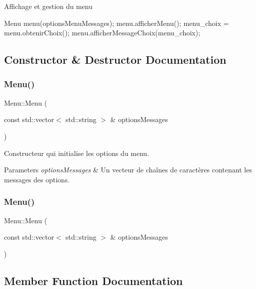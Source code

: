 Affichage et gestion du menu \begin{DoxyVerb}Menu menu(optionsMenuMessages);
menu.afficherMenu();
menu_choix = menu.obtenirChoix();
menu.afficherMessageChoix(menu_choix);\end{DoxyVerb}
 

\subsection{Constructor \& Destructor Documentation}
\mbox{\label{classMenu_a08614e9db9f4da4c6bcd37887d3df51a}} 
\subsubsection{\texorpdfstring{Menu()}{Menu()}\hspace{0.1cm}{\footnotesize\ttfamily [1/2]}}
{\footnotesize\ttfamily Menu\+::\+Menu (\begin{DoxyParamCaption}\item[{const std\+::vector$<$ std\+::string $>$ \&}]{options\+Messages }\end{DoxyParamCaption})}



Constructeur qui initialise les options du menu. 


\begin{DoxyParams}{Parameters}
{\em options\+Messages} & Un vecteur de chaînes de caractères contenant les messages des options. \\
\hline
\end{DoxyParams}
\mbox{\label{classMenu_a08614e9db9f4da4c6bcd37887d3df51a}} 
\subsubsection{\texorpdfstring{Menu()}{Menu()}\hspace{0.1cm}{\footnotesize\ttfamily [2/2]}}
{\footnotesize\ttfamily Menu\+::\+Menu (\begin{DoxyParamCaption}\item[{const std\+::vector$<$ std\+::string $>$ \&}]{options\+Messages }\end{DoxyParamCaption})}



\subsection{Member Function Documentation}
\mbox{\label{classMenu_a27c166b79b757c245c6183ee8dd5cf2a}} 
